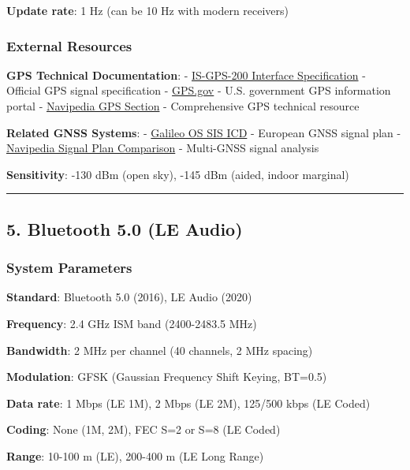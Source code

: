 \textbf{Update rate}: 1 Hz (can be 10 Hz with modern receivers)

\subsubsection{External Resources}\label{external-resources}

\textbf{GPS Technical Documentation}: -
\href{https://www.gps.gov/technical/icwg/IS-GPS-200M.pdf}{IS-GPS-200
Interface Specification} - Official GPS signal specification -
\href{https://www.gps.gov/}{GPS.gov} - U.S. government GPS information
portal -
\href{https://gssc.esa.int/navipedia/index.php?title=GPS}{Navipedia GPS
Section} - Comprehensive GPS technical resource

\textbf{Related GNSS Systems}: -
\href{https://www.gsc-europa.eu/sites/default/files/sites/all/files/Galileo_OS_SIS_ICD_v2.0.pdf}{Galileo
OS SIS ICD} - European GNSS signal plan -
\href{https://gssc.esa.int/navipedia/index.php?title=GALILEO_Signal_Plan}{Navipedia
Signal Plan Comparison} - Multi-GNSS signal analysis

\textbf{Sensitivity}: -130 dBm (open sky), -145 dBm (aided, indoor
marginal)

\begin{center}\rule{0.5\linewidth}{0.5pt}\end{center}

\subsection{5. Bluetooth 5.0 (LE Audio)}\label{bluetooth-5.0-le-audio}

\subsubsection{System Parameters}\label{system-parameters-4}

\textbf{Standard}: Bluetooth 5.0 (2016), LE Audio (2020)

\textbf{Frequency}: 2.4 GHz ISM band (2400-2483.5 MHz)

\textbf{Bandwidth}: 2 MHz per channel (40 channels, 2 MHz spacing)

\textbf{Modulation}: GFSK (Gaussian Frequency Shift Keying, BT=0.5)

\textbf{Data rate}: 1 Mbps (LE 1M), 2 Mbps (LE 2M), 125/500 kbps (LE
Coded)

\textbf{Coding}: None (1M, 2M), FEC S=2 or S=8 (LE Coded)

\textbf{Range}: 10-100 m (LE), 200-400 m (LE Long Range)

